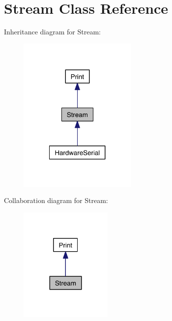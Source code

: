 \hypertarget{classStream}{
\section{\-Stream \-Class \-Reference}
\label{classStream}
}


\-Inheritance diagram for \-Stream\-:\nopagebreak
\begin{figure}[H]
\begin{center}
\leavevmode
\includegraphics[width=164pt]{classStream__inherit__graph}
\end{center}
\end{figure}


\-Collaboration diagram for \-Stream\-:\nopagebreak
\begin{figure}[H]
\begin{center}
\leavevmode
\includegraphics[width=128pt]{classStream__coll__graph}
\end{center}
\end{figure}
